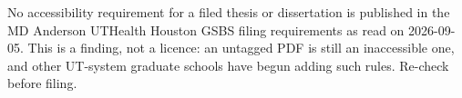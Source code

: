 

	{No accessibility requirement for a filed thesis or dissertation is
	 published in the MD Anderson UTHealth Houston GSBS filing requirements as
	 read on 2026-09-05. This is a finding, not a licence: an untagged PDF is
	 still an inaccessible one, and other UT-system graduate schools have begun
	 adding such rules. Re-check before filing.}

